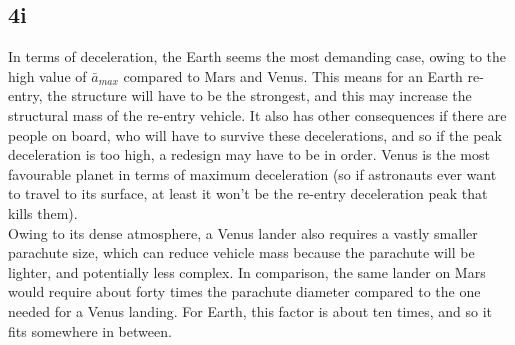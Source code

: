 \subsection{4i}
In terms of deceleration, the Earth seems the most demanding case, owing to the high value of $\bar{a}_{max}$ compared to Mars and Venus. This means for an Earth re-entry, the structure will have to be the strongest, and this may increase the structural mass of the re-entry vehicle. It also has other consequences if there are people on board, who will have to survive these decelerations, and so if the peak deceleration is too high, a redesign may have to be in order. Venus is the most favourable planet in terms of maximum deceleration (so if astronauts ever want to travel to its surface, at least it won't be the re-entry deceleration peak that kills them). \\
Owing to its dense atmosphere, a Venus lander also requires a vastly smaller parachute size, which can reduce vehicle mass because the parachute will be lighter, and potentially less complex. In comparison, the same lander on Mars would require about forty times the parachute diameter compared to the one needed for a Venus landing. For Earth, this factor is about ten times, and so it fits somewhere in between.